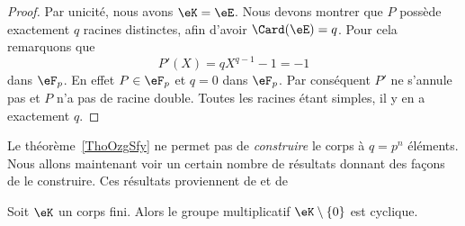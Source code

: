 \begin{proof}
	Par unicité, nous avons \( \eK=\eE\). Nous devons montrer que \( P\) possède exactement \( q\) racines distinctes, afin d'avoir \( \Card(\eE)=q\). Pour cela remarquons que
	\begin{equation}
		P'(X)=qX^{q-1}-1=-1
	\end{equation}
	dans \( \eF_p\). En effet \( P\in\eF_p\) et \( q=0\) dans \( \eF_p\). Par conséquent \( P'\) ne s'annule pas et \( P\) n'a pas de racine double. Toutes les racines étant simples, il y en a exactement \( q\).
\end{proof}

Le théorème~\ref{ThoOzgSfy} ne permet pas de \emph{construire} le corps à \( q=p^n\) éléments. Nous allons maintenant voir un certain nombre de résultats donnant des façons de le construire. Ces résultats proviennent de \cite{MichelMerlecorpsfinis,GabrielPeyre,RodierCorpsFinis} et de 

\begin{proposition}     \label{PropnfebjI}
	Soit \( \eK\) un corps fini. Alors le groupe multiplicatif \( \eK\setminus\{ 0 \}\) est cyclique.
\end{proposition}

